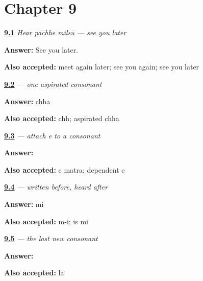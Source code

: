 \section*{Chapter 9}

\noindent\begin{minipage}[t]{\linewidth}
\raggedright
\hyperlink{review-MW-C07-hear-later-meaning}{\textbf{9.1}} \emph{Hear \emph{pāchhe milsū} — see you later}\par
\small \textbf{Answer:} See you later.\par
\footnotesize \textbf{Also accepted:} meet again later; see you again; see you later
\end{minipage}\par\medskip

\noindent\begin{minipage}[t]{\linewidth}
\raggedright
\hyperlink{review-MW-W07-chha-read}{\textbf{9.2}} \emph{ — one aspirated consonant}\par
\small \textbf{Answer:} chha\par
\footnotesize \textbf{Also accepted:} chh; aspirated chha
\end{minipage}\par\medskip

\noindent\begin{minipage}[t]{\linewidth}
\raggedright
\hyperlink{review-MW-W07-e-matra-build}{\textbf{9.3}} \emph{ — attach \emph{e} to a consonant}\par
\small \textbf{Answer:} \par
\footnotesize \textbf{Also accepted:} e matra; dependent e
\end{minipage}\par\medskip

\noindent\begin{minipage}[t]{\linewidth}
\raggedright
\hyperlink{review-MW-W07-i-matra-order}{\textbf{9.4}} \emph{ — written before, heard after}\par
\small \textbf{Answer:} mi\par
\footnotesize \textbf{Also accepted:} m-i;  is mi
\end{minipage}\par\medskip

\noindent\begin{minipage}[t]{\linewidth}
\raggedright
\hyperlink{review-MW-W07-la-write}{\textbf{9.5}} \emph{ — the last new consonant}\par
\small \textbf{Answer:} \par
\footnotesize \textbf{Also accepted:}  la
\end{minipage}\par\medskip

